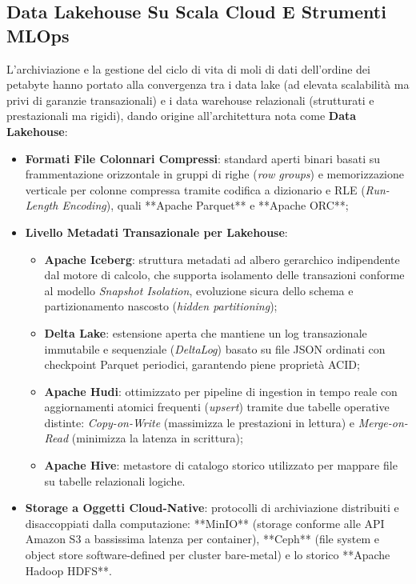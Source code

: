 \documentclass[11pt, a4paper]{article}
\begin{document}


\subsection{Data Lakehouse Su Scala Cloud E Strumenti MLOps}

L'archiviazione e la gestione del ciclo di vita di moli di dati dell'ordine dei petabyte hanno portato alla convergenza tra i data lake (ad elevata scalabilità ma privi di garanzie transazionali) e i data warehouse relazionali (strutturati e prestazionali ma rigidi), dando origine all'architettura nota come \textbf{Data Lakehouse}:
\begin{itemize}
    \item \textbf{Formati File Colonnari Compressi}: standard aperti binari basati su frammentazione orizzontale in gruppi di righe (\emph{row groups}) e memorizzazione verticale per colonne compressa tramite codifica a dizionario e RLE (\emph{Run-Length Encoding}), quali **Apache Parquet** e **Apache ORC**;
    \item \textbf{Livello Metadati Transazionale per Lakehouse}:
    \begin{itemize}
        \item \textbf{Apache Iceberg}: struttura metadati ad albero gerarchico indipendente dal motore di calcolo, che supporta isolamento delle transazioni conforme al modello \emph{Snapshot Isolation}, evoluzione sicura dello schema e partizionamento nascosto (\emph{hidden partitioning});
        \item \textbf{Delta Lake}: estensione aperta che mantiene un log transazionale immutabile e sequenziale (\emph{DeltaLog}) basato su file JSON ordinati con checkpoint Parquet periodici, garantendo piene proprietà ACID;
        \item \textbf{Apache Hudi}: ottimizzato per pipeline di ingestion in tempo reale con aggiornamenti atomici frequenti (\emph{upsert}) tramite due tabelle operative distinte: \emph{Copy-on-Write} (massimizza le prestazioni in lettura) e \emph{Merge-on-Read} (minimizza la latenza in scrittura);
        \item \textbf{Apache Hive}: metastore di catalogo storico utilizzato per mappare file su tabelle relazionali logiche.
    \end{itemize}
    \item \textbf{Storage a Oggetti Cloud-Native}: protocolli di archiviazione distribuiti e disaccoppiati dalla computazione: **MinIO** (storage conforme alle API Amazon S3 a bassissima latenza per container), **Ceph** (file system e object store software-defined per cluster bare-metal) e lo storico **Apache Hadoop HDFS**.
\end{itemize}
\end{document}
